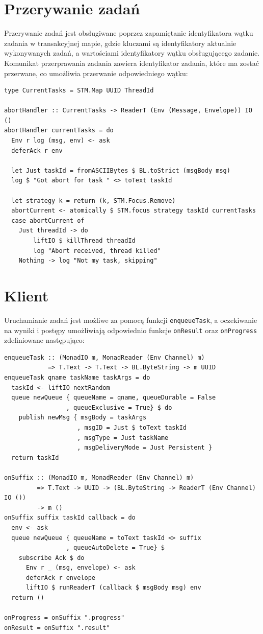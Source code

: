 \section{Przerywanie zadań}
Przerywanie zadań jest obsługiwane poprzez zapamiętanie identyfikatora wątku zadania w transakcyjnej mapie\cite{STMMap}, gdzie kluczami są identyfikatory aktualnie wykonywanych zadań, a wartościami identyfikatory wątku obsługującego zadanie. Komunikat przerprawania zadania zawiera identyfikator zadania, które ma zostać przerwane, co umożliwia przerwanie odpowiedniego wątku:
\begin{lstlisting}
type CurrentTasks = STM.Map UUID ThreadId

abortHandler :: CurrentTasks -> ReaderT (Env (Message, Envelope)) IO ()
abortHandler currentTasks = do
  Env r log (msg, env) <- ask
  deferAck r env

  let Just taskId = fromASCIIBytes $ BL.toStrict (msgBody msg)
  log $ "Got abort for task " <> toText taskId

  let strategy k = return (k, STM.Focus.Remove)
  abortCurrent <- atomically $ STM.focus strategy taskId currentTasks
  case abortCurrent of
    Just threadId -> do
        liftIO $ killThread threadId
        log "Abort received, thread killed"
    Nothing -> log "Not my task, skipping"
\end{lstlisting}
\newpage
\section{Klient}
Uruchamianie zadań jest możliwe za pomocą funkcji \lstinline{enqueueTask}, a oczekiwanie na wyniki i postępy umożliwiają odpowiednio funkcje \lstinline{onResult} oraz \lstinline{onProgress} zdefiniowane następująco:

\begin{lstlisting}[caption=Klient uruchamiający zadania]
enqueueTask :: (MonadIO m, MonadReader (Env Channel) m) 
            => T.Text -> T.Text -> BL.ByteString -> m UUID
enqueueTask qname taskName taskArgs = do
  taskId <- liftIO nextRandom
  queue newQueue { queueName = qname, queueDurable = False
                 , queueExclusive = True} $ do
    publish newMsg { msgBody = taskArgs
                    , msgID = Just $ toText taskId
                    , msgType = Just taskName
                    , msgDeliveryMode = Just Persistent }
  return taskId

onSuffix :: (MonadIO m, MonadReader (Env Channel) m) 
         => T.Text -> UUID -> (BL.ByteString -> ReaderT (Env Channel) IO ()) 
         -> m () 
onSuffix suffix taskId callback = do
  env <- ask
  queue newQueue { queueName = toText taskId <> suffix
                 , queueAutoDelete = True} $
    subscribe Ack $ do
      Env r _ (msg, envelope) <- ask
      deferAck r envelope
      liftIO $ runReaderT (callback $ msgBody msg) env
  return ()

onProgress = onSuffix ".progress"
onResult = onSuffix ".result"

\end{lstlisting}

